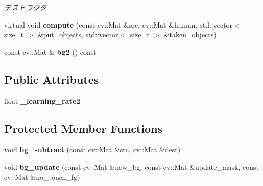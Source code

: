 \begin{DoxyCompactItemize}
\begin{DoxyCompactList}\small\item\em デストラクタ \end{DoxyCompactList}\item 
\hypertarget{classskl_1_1_table_object_manager_bi_background_a0601f81ef37c34f1b6bd3c95fd9fbcf3}{}\label{classskl_1_1_table_object_manager_bi_background_a0601f81ef37c34f1b6bd3c95fd9fbcf3} 
virtual void {\bfseries compute} (const cv\+::\+Mat \&src, cv\+::\+Mat \&human, std\+::vector$<$ size\+\_\+t $>$ \&put\+\_\+objects, std\+::vector$<$ size\+\_\+t $>$ \&taken\+\_\+objects)
\item 
\hypertarget{classskl_1_1_table_object_manager_bi_background_a01c366c81705243ede4ce322089324c8}{}\label{classskl_1_1_table_object_manager_bi_background_a01c366c81705243ede4ce322089324c8} 
const cv\+::\+Mat \& {\bfseries bg2} () const
\end{DoxyCompactItemize}
\subsection*{Public Attributes}
\begin{DoxyCompactItemize}
\item 
\hypertarget{classskl_1_1_table_object_manager_bi_background_acf8fb57cd0bdd70f8aa8072b2417c809}{}\label{classskl_1_1_table_object_manager_bi_background_acf8fb57cd0bdd70f8aa8072b2417c809} 
float {\bfseries \+\_\+learning\+\_\+rate2}
\end{DoxyCompactItemize}
\subsection*{Protected Member Functions}
\begin{DoxyCompactItemize}
\item 
\hypertarget{classskl_1_1_table_object_manager_bi_background_a38c74ac192fce56a894e988906f16597}{}\label{classskl_1_1_table_object_manager_bi_background_a38c74ac192fce56a894e988906f16597} 
void {\bfseries bg\+\_\+subtract} (const cv\+::\+Mat \&src, cv\+::\+Mat \&dest)
\item 
\hypertarget{classskl_1_1_table_object_manager_bi_background_ad3587a9842be2f26376e535839503a8e}{}\label{classskl_1_1_table_object_manager_bi_background_ad3587a9842be2f26376e535839503a8e} 
void {\bfseries bg\+\_\+update} (const cv\+::\+Mat \&new\+\_\+bg, const cv\+::\+Mat \&update\+\_\+mask, const cv\+::\+Mat \&no\+\_\+touch\+\_\+fg)
\end{DoxyCompactItemize}
